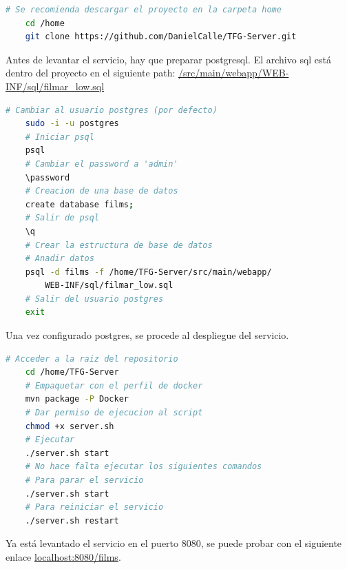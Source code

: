 \begin{lstlisting}[language=bash, caption=Descarga del proyecto]
    # Se recomienda descargar el proyecto en la carpeta home
    cd /home
    git clone https://github.com/DanielCalle/TFG-Server.git
\end{lstlisting}

Antes de levantar el servicio, hay que preparar postgresql. El archivo sql está dentro del proyecto
en el siguiente path: \url{/src/main/webapp/WEB-INF/sql/filmar_low.sql}

\begin{lstlisting}[language=bash, caption=Configuración postgresql]
    # Cambiar al usuario postgres (por defecto)
    sudo -i -u postgres
    # Iniciar psql
    psql
    # Cambiar el password a 'admin'
    \password
    # Creacion de una base de datos
    create database films;
    # Salir de psql
    \q
    # Crear la estructura de base de datos
    # Anadir datos
    psql -d films -f /home/TFG-Server/src/main/webapp/
        WEB-INF/sql/filmar_low.sql
    # Salir del usuario postgres
    exit
\end{lstlisting}

Una vez configurado postgres, se procede al despliegue del servicio.

\begin{lstlisting}[language=bash, caption=Despliegue]
    # Acceder a la raiz del repositorio
    cd /home/TFG-Server
    # Empaquetar con el perfil de docker
    mvn package -P Docker
    # Dar permiso de ejecucion al script
    chmod +x server.sh
    # Ejecutar 
    ./server.sh start
    # No hace falta ejecutar los siguientes comandos
    # Para parar el servicio
    ./server.sh start
    # Para reiniciar el servicio
    ./server.sh restart
\end{lstlisting}

Ya está levantado el servicio en el puerto 8080, se puede probar con el siguiente enlace
\url{localhost:8080/films}.

